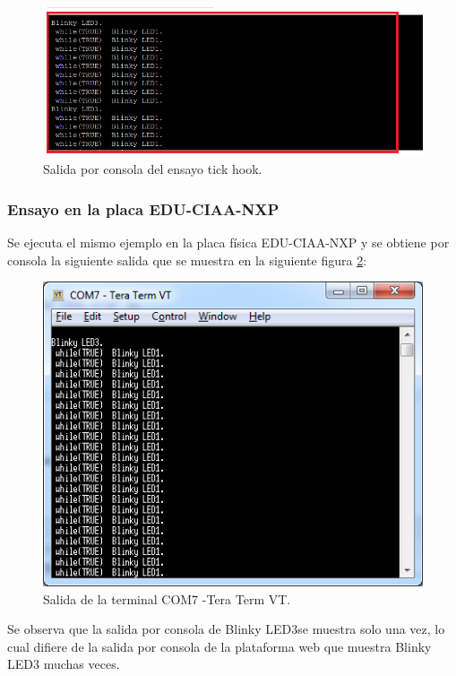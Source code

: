 \begin{figure}[ht]
	\centering
	\includegraphics[scale=.49]{./Figures/Testtickhook2.png}
	\caption{Salida por consola del ensayo tick hook.}
	\label{fig:Testtickhook2}
\end{figure}

\subsubsection{Ensayo en la placa EDU-CIAA-NXP} 

Se ejecuta el mismo ejemplo en la placa física EDU-CIAA-NXP y se obtiene por consola la siguiente salida que se muestra en la siguiente figura \ref{fig:TesttickhookPlaca}:


\begin{figure}[ht]
	\centering
	\includegraphics[scale=.80]{./Figures/TesttickhookPlaca.png}
	\caption{Salida de la terminal COM7 -Tera Term VT.}
	\label{fig:TesttickhookPlaca}
\end{figure}

Se observa que la salida por consola de \textquotedbl Blinky LED3\textquotedbl se muestra solo una vez, lo cual difiere de la salida por consola de la plataforma web que muestra \textquotedbl Blinky LED3\textquotedbl{} muchas veces.

